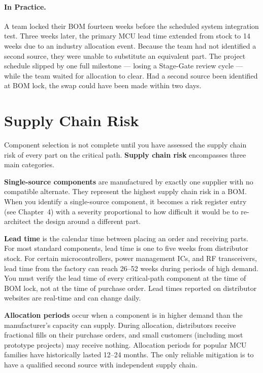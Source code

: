 \paragraph{In Practice.}
A team locked their BOM fourteen weeks before the scheduled system integration test.
Three weeks later, the primary MCU lead time extended from stock to 14 weeks due to an industry allocation event.
Because the team had not identified a second source, they were unable to substitute an equivalent part.
The project schedule slipped by one full milestone --- losing a Stage-Gate review cycle --- while the team waited for allocation to clear.
Had a second source been identified at BOM lock, the swap could have been made within two days.

\section{Supply Chain Risk}
\label{sec:ch6-supply}

Component selection is not complete until you have assessed the supply chain risk of every part on the critical path.
\textbf{Supply chain risk} encompasses three main categories.

\textbf{Single-source components} are manufactured by exactly one supplier with no compatible alternate.
They represent the highest supply chain risk in a BOM.
When you identify a single-source component, it becomes a risk register entry (see Chapter~4) with a severity proportional to how difficult it would be to re-architect the design around a different part.

\textbf{Lead time} is the calendar time between placing an order and receiving parts.
For most standard components, lead time is one to five weeks from distributor stock.
For certain microcontrollers, power management ICs, and RF transceivers, lead time from the factory can reach 26--52 weeks during periods of high demand.
You must verify the lead time of every critical-path component at the time of BOM lock, not at the time of purchase order.
Lead times reported on distributor websites are real-time and can change daily.

\textbf{Allocation periods} occur when a component is in higher demand than the manufacturer's capacity can supply.
During allocation, distributors receive fractional fills on their purchase orders, and small customers (including most prototype projects) may receive nothing.
Allocation periods for popular MCU families have historically lasted 12--24 months.
The only reliable mitigation is to have a qualified second source with independent supply chain.

